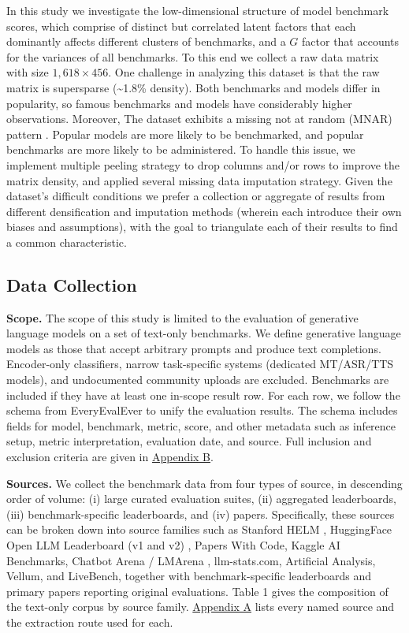\documentclass{article} %
\begin{document}
In this study we investigate the low-dimensional structure of model benchmark scores, which comprise of distinct but correlated latent factors that each dominantly affects different clusters of
benchmarks, and a \(G\) factor that accounts for the variances of all benchmarks. To this end we collect a raw data matrix with size \(1,618 \times 456\). One challenge in analyzing this dataset is
that the raw matrix is supersparse (\textasciitilde1.8\% density). Both benchmarks and models differ in popularity, so famous benchmarks and models have considerably higher observations. Moreover, The
dataset exhibits a missing not at random (MNAR) pattern \citep{rubin1976}. Popular models are more likely to be benchmarked, and popular benchmarks are more likely to be administered. To handle this
issue, we implement multiple peeling strategy to drop columns and/or rows to improve the matrix density, and applied several missing data imputation strategy. Given the dataset's difficult conditions
we prefer a collection or aggregate of results from different densification and imputation methods (wherein each introduce their own biases and assumptions), with the goal to triangulate each of their
results to find a common characteristic.

\hypertarget{data-collection}{%
\subsection{Data Collection}\label{data-collection}}

\textbf{Scope.} The scope of this study is limited to the evaluation of generative language models on a set of text-only benchmarks. We define generative language models as those that accept arbitrary
prompts and produce text completions. Encoder-only classifiers, narrow task-specific systems (dedicated MT/ASR/TTS models), and undocumented community uploads are excluded. Benchmarks are included if
they have at least one in-scope result row. For each row, we follow the schema from EveryEvalEver \citep{everyevalever2026} to unify the evaluation results. The schema includes fields for model,
benchmark, metric, score, and other metadata such as inference setup, metric interpretation, evaluation date, and source. Full inclusion and exclusion criteria are given in
\href{Appendix-Methods\#B\%20Inclusion\%20and\%20exclusion\%20criteria}{Appendix B}.

\textbf{Sources.} We collect the benchmark data from four types of source, in descending order of volume: (i) large curated evaluation suites, (ii) aggregated leaderboards, (iii) benchmark-specific
leaderboards, and (iv) papers. Specifically, these sources can be broken down into source families such as Stanford HELM \citep{helm2023}, HuggingFace Open LLM Leaderboard (v1 and v2)
\citep{openllmleaderboard2024}, Papers With Code, Kaggle AI Benchmarks, Chatbot Arena / LMArena \citep{chatbotarena2024}, llm-stats.com, Artificial Analysis, Vellum, and LiveBench, together with
benchmark-specific leaderboards and primary papers reporting original evaluations. Table 1 gives the composition of the text-only corpus by source family.
\href{Appendix-Methods\#A\%20Data\%20sources\%20and\%20extraction}{Appendix A} lists every named source and the extraction route used for each.
\end{document}
